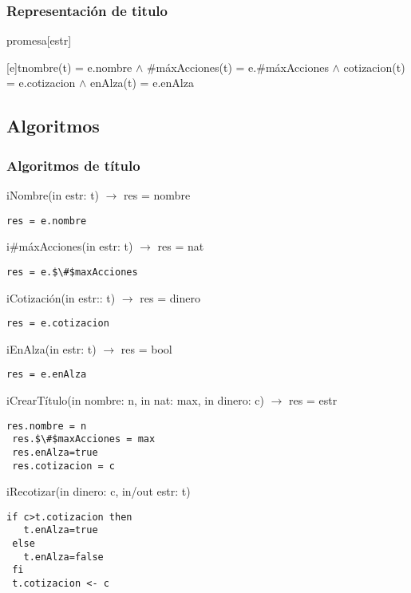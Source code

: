 \subsubsection{Representaci\'on de titulo}
\begin{Estructura}{promesa}[estr]
    \begin{Tupla}[estr]
    \end{Tupla}
\end{Estructura}


[e]{t}{nombre(t) = e.nombre $\land$ $\#$m\'axAcciones(t) = e.$\#$m\'axAcciones $\land$ cotizacion(t) = e.cotizacion $\land$ enAlza(t) = e.enAlza}

  \subsection{Algoritmos}
\subsubsection{Algoritmos de t\'itulo}

iNombre(in estr: t) $\rightarrow$ res = nombre
\begin{lstlisting}[mathescape]
 res = e.nombre
\end{lstlisting}

i$\#$m\'axAcciones(in estr: t) $\rightarrow$ res = nat
\begin{lstlisting}[mathescape]
 res = e.$\#$maxAcciones
\end{lstlisting}

iCotizaci\'on(in estr:: t) $\rightarrow$ res = dinero
\begin{lstlisting}[mathescape]
 res = e.cotizacion
\end{lstlisting}


iEnAlza(in estr: t) $\rightarrow$ res = bool
\begin{lstlisting}[mathescape]
 res = e.enAlza
\end{lstlisting}

iCrearT\'itulo(in nombre: n, in nat: max, in dinero: c) $\rightarrow$ res = estr
\begin{lstlisting}[mathescape]
 res.nombre = n
 res.$\#$maxAcciones = max
 res.enAlza=true
 res.cotizacion = c
\end{lstlisting}

iRecotizar(in dinero: c, in/out estr: t)
\begin{lstlisting}[mathescape]
 if c>t.cotizacion then
   t.enAlza=true
 else
   t.enAlza=false
 fi
 t.cotizacion <- c
\end{lstlisting}
